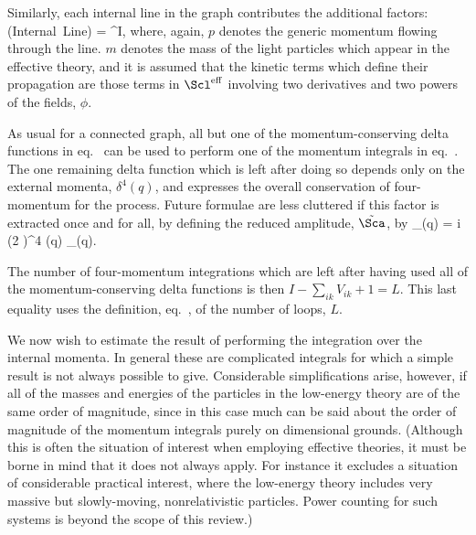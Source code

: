 Similarly, each internal line in the graph contributes the
additional factors:
%
\eq
\label{internallinecont}
\hbox{(Internal Line)} = ^I,
\eeq
%
where, again, $p$ denotes the generic momentum flowing
through the line. $m$ denotes the mass of the light
particles which appear in the effective theory, and it is
assumed that the kinetic terms which define their
propagation are those terms in $\leff$ involving two
derivatives and two powers of the fields, $\phi$.

As usual for a connected graph, all but one of the
momentum-conserving delta functions in
eq.~ can be used to perform one of the
momentum integrals in 
eq.~. The one remaining delta
function which is left after doing so depends only on the
external momenta, $\delta^4(q)$, and expresses the overall
conservation of four-momentum for the process. Future
formulae are less cluttered if this factor is extracted
once and for all, by defining the reduced amplitude,
$\tilde \Sca$, by
%
\eq
\label{redampdef}
\Sca_\sse(q) = i (2 \pi)^4 \delta(q) \; \tilde\Sca_\sse(q).
\eeq

The number of four-momentum integrations which are left
after having used all of the momentum-conserving delta
functions is then $I - \sum_{ik} V_{ik} + 1 = L$. This last
equality uses the definition, eq.~, of the
number of loops, $L$.

We now wish to estimate the result of performing the
integration over the internal momenta. In general these
are complicated integrals for which a simple result is not
always possible to give. Considerable simplifications arise,
however, if all of the masses and energies of the
particles in the low-energy theory are of the same order
of magnitude, since in this case much can be said about
the order of magnitude of the momentum integrals purely on 
dimensional grounds. (Although this is often the situation
of interest when employing effective theories, it must be
borne in mind that it does not always apply. For instance
it excludes a situation of considerable practical interest, 
where the low-energy theory includes very massive but 
slowly-moving, nonrelativistic particles. Power counting
for such systems is beyond the scope of this review.)

